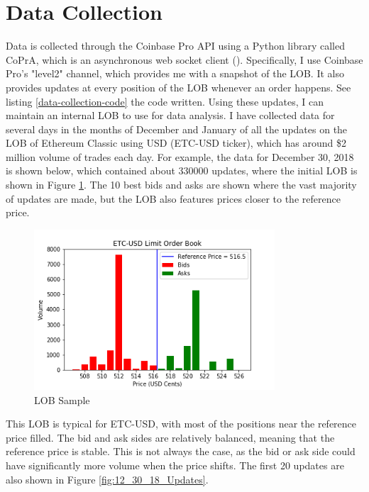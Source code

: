 \section{Data Collection}
Data is collected through the Coinbase Pro API using a Python library called CoPrA, which is an asynchronous web socket client (\cite{L3}). Specifically, I use Coinbase Pro's "level2" channel, which provides me with a snapshot of the LOB. It also provides updates at every position of the LOB whenever an order happens. See listing \ref{data-collection-code} the code written. Using these updates, I can maintain an internal LOB to use for data analysis. I have collected data for several days in the months of December and January of all the updates on the LOB of Ethereum Classic using USD (ETC-USD ticker), which has around \$2 million volume of trades each day. For example, the data for December 30, 2018 is shown below, which contained about 330000 updates, where the initial LOB is shown  in Figure \ref{fig:12_30_18_LOB_pic}. The 10 best bids and asks are shown where the vast majority of updates are made, but the LOB also features prices closer to the reference price.

\begin{figure}[t]
\begin{center}
\includegraphics[width=0.8\textwidth]{Figures/12_30_18_LOB.png}
\caption{LOB Sample}
\label{fig:12_30_18_LOB_pic}
\end{center}
\end{figure}

This LOB is typical for ETC-USD, with most of the positions near the reference price filled. The bid and ask sides are relatively balanced, meaning that the reference price is stable. This is not always the case, as the bid or ask side could have significantly more volume when the price shifts. The first 20 updates are also shown in Figure \ref{fig:12_30_18_Updates}.

